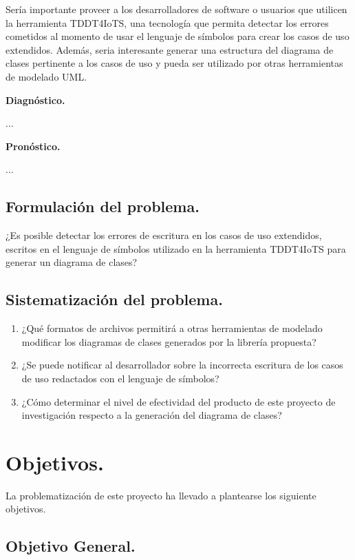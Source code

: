 Sería importante proveer a los desarrolladores de software o usuarios que utilicen la herramienta TDDT4IoTS, una tecnología que permita detectar los errores cometidos al momento de usar el lenguaje de símbolos para crear los casos de uso extendidos. Además, seria interesante generar una estructura del diagrama de clases pertinente a los casos de uso y pueda ser utilizado por otras herramientas de modelado UML.

\textbf{Diagnóstico.}

...

\textbf{Pronóstico.}

...

\subsection{Formulación del problema.}

¿Es posible detectar los errores de escritura en los casos de uso extendidos, escritos en el lenguaje de símbolos utilizado en la herramienta TDDT4IoTS para generar un diagrama de clases?

\subsection{Sistematización del problema.}

\begin{enumerate}
	\item ¿Qué formatos de archivos permitirá a otras herramientas de modelado modificar los diagramas de clases generados por la librería propuesta?
	
	\item ¿Se puede notificar al desarrollador sobre la incorrecta escritura de los casos de uso redactados con el lenguaje de símbolos?
	
	\item ¿Cómo determinar el nivel de efectividad del producto de este proyecto de investigación respecto a la generación del diagrama de clases?
\end{enumerate}

\section{Objetivos.}

La problematización de este proyecto ha llevado a plantearse los siguiente objetivos.

\subsection{Objetivo General.}

